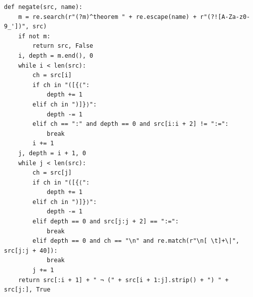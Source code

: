 \documentclass[10pt,twocolumn]{article}
\begin{document}
\begin{Verbatim}
def negate(src, name):
    m = re.search(r"(?m)^theorem " + re.escape(name) + r"(?![A-Za-z0-9_'])", src)
    if not m:
        return src, False
    i, depth = m.end(), 0
    while i < len(src):
        ch = src[i]
        if ch in "([{⟨":
            depth += 1
        elif ch in ")]}⟩":
            depth -= 1
        elif ch == ":" and depth == 0 and src[i:i + 2] != ":=":
            break
        i += 1
    j, depth = i + 1, 0
    while j < len(src):
        ch = src[j]
        if ch in "([{⟨":
            depth += 1
        elif ch in ")]}⟩":
            depth -= 1
        elif depth == 0 and src[j:j + 2] == ":=":
            break
        elif depth == 0 and ch == "\n" and re.match(r"\n[ \t]+\|", src[j:j + 40]):
            break
        j += 1
    return src[:i + 1] + " ¬ (" + src[i + 1:j].strip() + ") " + src[j:], True



\end{Verbatim}
\end{document}
